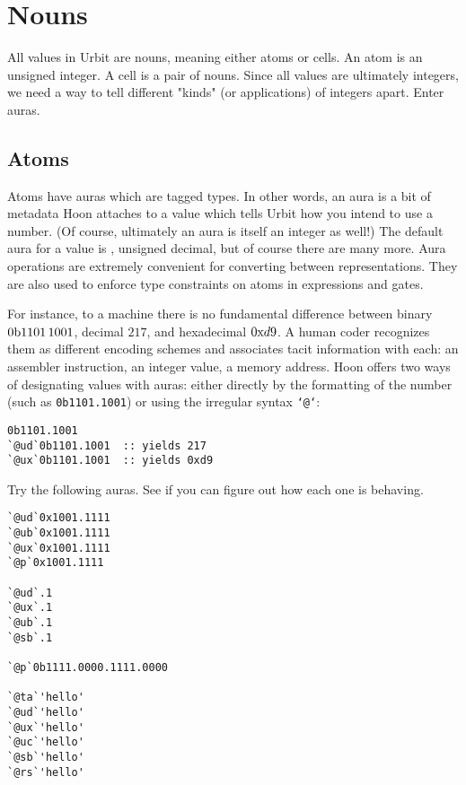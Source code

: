 \section{Nouns}

All values in Urbit are nouns, meaning either atoms or cells.  An atom is an unsigned integer.  A cell is a pair of nouns.  Since all values are ultimately integers, we need a way to tell different "kinds" (or applications) of integers apart.  Enter auras.

\subsection{Atoms}

Atoms have auras which are tagged types.  In other words, an aura is a bit of metadata Hoon attaches to a value which tells Urbit how you intend to use a number.  (Of course, ultimately an aura is itself an integer as well!)  The default aura for a value is \patud, unsigned decimal, but of course there are many more.  Aura operations are extremely convenient for converting between representations.  They are also used to enforce type constraints on atoms in expressions and gates.

For instance, to a machine there is no fundamental difference between binary $\ub 1101\,1001$, decimal $217$, and hexadecimal $\ux d9$.  A human coder recognizes them as different encoding schemes and associates tacit information with each:  an assembler instruction, an integer value, a memory address.  Hoon offers two ways of designating values with auras:  either directly by the formatting of the number (such as \texttt{0b1101.1001}) or using the irregular syntax \texttt{`@`}:

\begin{lstlisting}[language=hoon,
                   style=nonumbers]
0b1101.1001
`@ud`0b1101.1001  :: yields 217
`@ux`0b1101.1001  :: yields 0xd9
\end{lstlisting}

\begin{example}
Try the following auras.  See if you can figure out how each one is behaving.

\begin{lstlisting}[language=hoon]
`@ud`0x1001.1111
`@ub`0x1001.1111
`@ux`0x1001.1111
`@p`0x1001.1111

`@ud`.1
`@ux`.1
`@ub`.1
`@sb`.1

`@p`0b1111.0000.1111.0000

`@ta`'hello'
`@ud`'hello'
`@ux`'hello'
`@uc`'hello'
`@sb`'hello'
`@rs`'hello'
\end{lstlisting}
\end{example}

